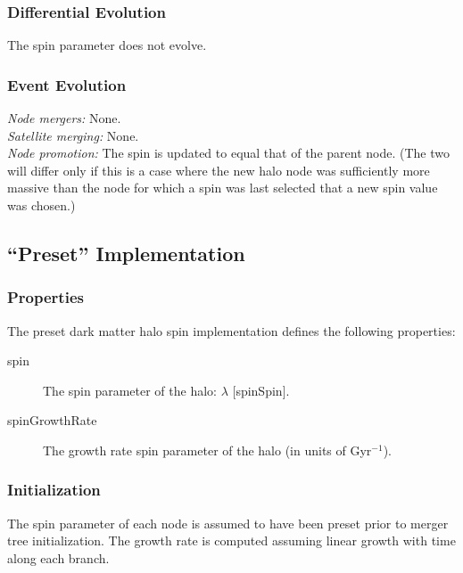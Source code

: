 \subsubsection{Differential Evolution}

The spin parameter does not evolve.

\subsubsection{Event Evolution}

\noindent\emph{Node mergers:} None.\\

\noindent\emph{Satellite merging:} None.\\

\noindent\emph{Node promotion:} The spin is updated to equal that of the parent node. (The two will differ only if this is a case where the new halo \gls{node} was sufficiently more massive than the \gls{node} for which a spin was last selected that a new spin value was chosen.)\\

\subsection{``Preset'' Implementation}

\subsubsection{Properties}

The preset dark matter halo spin implementation defines the following properties:
\begin{description}
 \item [{\normalfont \ttfamily spin}] The spin parameter of the halo: $\lambda$ [{\normalfont \ttfamily spinSpin}].
 \item [{\normalfont \ttfamily spinGrowthRate}] The growth rate spin parameter of the halo (in units of Gyr$^{-1}$).
\end{description}

\subsubsection{Initialization}

The spin parameter of each \gls{node} is assumed to have been preset prior to merger tree initialization. The growth rate is computed assuming linear growth with time along each branch.

